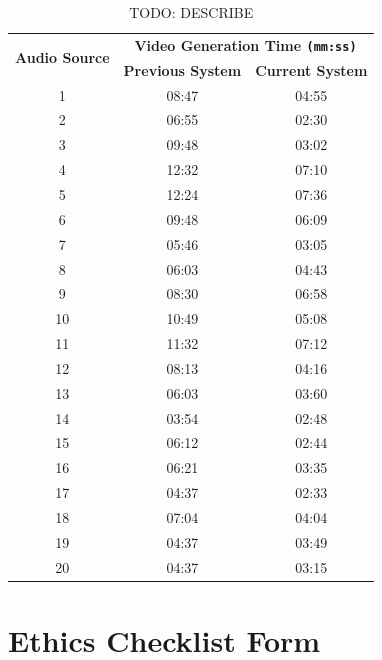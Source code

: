 \documentclass{l4proj}
\begin{document}
\begin{appendices}
\begin{table}
    \centering
    \begin{tabular}{|c|c|c|}
        \hline
        \multirow{2}{*}{\textbf{Audio Source}} & 
        \multicolumn{2}{|c|}{\textbf{Video Generation Time \lstinline|(mm:ss)|}} \\
        \cline{2-3} & \textbf{Previous System} & \textbf{Current System} \\ 
        \hline
        \hline
        1 & 08:47 & 04:55 \\
        \hline
        2 & 06:55 & 02:30 \\
        \hline
        3 & 09:48 & 03:02 \\
        \hline
        4 & 12:32 & 07:10 \\
        \hline
        5 & 12:24 & 07:36 \\
        \hline
        6 & 09:48 & 06:09 \\
        \hline
        7 & 05:46 & 03:05 \\
        \hline
        8 & 06:03 & 04:43 \\
        \hline
        9 & 08:30 & 06:58 \\
        \hline
        10 & 10:49 & 05:08 \\
        \hline
        11 & 11:32 & 07:12 \\
        \hline
        12 & 08:13 & 04:16 \\
        \hline
        13 & 06:03 & 03:60 \\
        \hline
        14 & 03:54 & 02:48 \\
        \hline
        15 & 06:12 & 02:44 \\
        \hline
        16 & 06:21 & 03:35 \\
        \hline
        17 & 04:37 & 02:33 \\
        \hline
        18 & 07:04 & 04:04 \\
        \hline
        19 & 04:37 & 03:49 \\
        \hline
        20 & 04:37 & 03:15 \\
        \hline
    \end{tabular}
    \caption{TODO: DESCRIBE}\label{tab:videography_times}
\end{table}


\chapter{Ethics Checklist Form}
\label{app:ethics_checklist}




\end{appendices}
\end{document}
